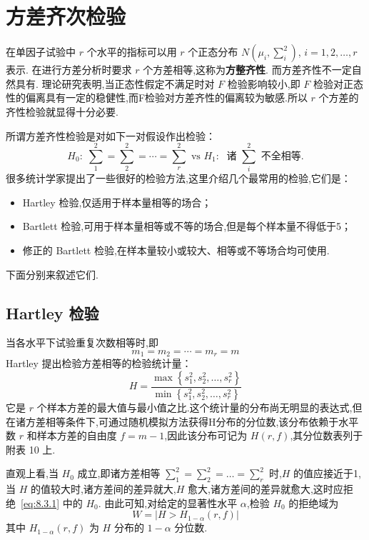 \section{方差齐次检验}\label{sec:8.3}
在单因子试验中 $r$ 个水平的指标可以用 $r$ 个正态分布 $N(\mu_i,\sum_i^2)$, $i=1,2,\ldots,r$ 表示. 在进行方差分析时要求 $r$ 个方差相等,这称为\textbf{方整齐性}. 而方差齐性不一定自然具有. 理论研究表明,当正态性假定不满足时对 $F$ 检验影响较小,即 $F$ 检验对正态性的偏离具有一定的稳健性,而F检验对方差齐性的偏离较为敏感.所以 $r$ 个方差的齐性检验就显得十分必要.

所谓方差齐性检验是对如下一对假设作出检验：
\begin{equation}\label{eq:8.3.1}
  H_0:\; \sum_1^2 = \sum_2^2 = \cdots = \sum_r^2 \text{ vs } H_1:\; \text{ 诸 } \sum_i^2 \text{ 不全相等}.
\end{equation}
很多统计学家提出了一些很好的检验方法,这里介绍几个最常用的检验,它们是：
\begin{itemize}
  \item Hartley 检验,仅适用于样本量相等的场合；
  \item Bartlett 检验,可用于样本量相等或不等的场合,但是每个样本量不得低于5；
  \item 修正的 Bartlett 检验,在样本量较小或较大、相等或不等场合均可使用.
\end{itemize}

下面分别来叙述它们.
\subsection{Hartley 检验}

当各水平下试验重复次数相等时,即
\begin{equation*}
  m_{1}=m_{2}=\cdots=m_{r}=m
\end{equation*}
Hartley 提出检验方差相等的检验统计量：
\begin{equation}\label{eq:8.3.2}
  H=\frac{\max \left\{s_{1}^{2}, s_{2}^{2}, \ldots, s_{r}^{2}\right\}}{\min \left\{s_{1}^{2}, s_{2}^{2}, \ldots, s_{r}^{2}\right\}}
\end{equation}
它是 $r$ 个样本方差的最大值与最小值之比.这个统计量的分布尚无明显的表达式,但在诸方差相等条件下,可通过随机模拟方法获得H分布的分位数,该分布依赖于水平数 $r$ 和样本方差的自由度 $f=m-1$,因此该分布可记为 $H(r,f)$,其分位数表列于附表 10 上.

直观上看,当 $H_0$ 成立,即诸方差相等 $\sum_1^2 = \sum_2^2= \ldots = \sum_r^2$ 时,$H$ 的值应接近于1,当 $H$ 的值较大时,诸方差间的差异就大,$H$ 愈大,诸方差间的差异就愈大,这时应拒绝~\eqref{eq:8.3.1} 中的 $H_0$. 由此可知,对给定的显著性水平 $\alpha$,检验 $H_0$ 的拒绝域为
\begin{equation}
  W=|H>H_{1-\alpha}(r, f)|
\end{equation}
其中 $H_{1-\alpha}(r,f)$ 为 $H$ 分布的 $1-\alpha$ 分位数.

